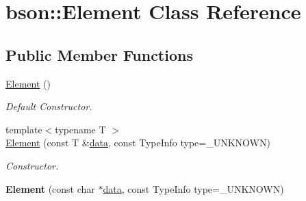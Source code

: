 \hypertarget{classbson_1_1_element}{\section{bson\+:\+:Element Class Reference}
\label{classbson_1_1_element}
}
\subsection*{Public Member Functions}
\begin{DoxyCompactItemize}
\item 
\hyperlink{classbson_1_1_element_a74a721f236327e588798713ecb7d2140}{Element} ()
\begin{DoxyCompactList}\small\item\em Default Constructor. \end{DoxyCompactList}\item 
{\footnotesize template$<$typename T $>$ }\\\hyperlink{classbson_1_1_element_a47bb78622c93b9c5ee46ba2306e2ecd9}{Element} (const T \&\hyperlink{classbson_1_1_element_a5a9f2e3fa927fb283adf8c47b39495e1}{data}, const Type\+Info type=\+\_\+\+U\+N\+K\+N\+O\+W\+N)
\begin{DoxyCompactList}\small\item\em Constructor. \end{DoxyCompactList}\item 
\hypertarget{classbson_1_1_element_a1e8662fb29bc50dee4f3dde16b3dfd9a}{{\bfseries Element} (const char $\ast$\hyperlink{classbson_1_1_element_a5a9f2e3fa927fb283adf8c47b39495e1}{data}, const Type\+Info type=\+\_\+\+U\+N\+K\+N\+O\+W\+N)}\label{classbson_1_1_element_a1e8662fb29bc50dee4f3dde16b3dfd9a}


\end{DoxyCompactItemize}
